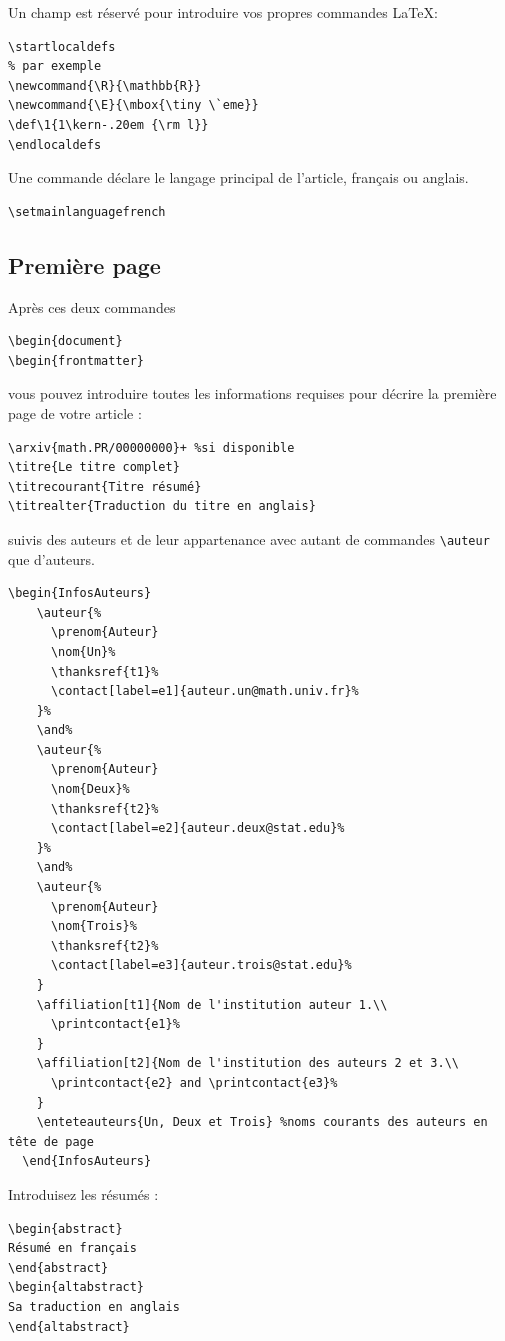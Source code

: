 \documentclass[soumission]{jsfds}
\newcommand{\R}{\mathbb{R}}
\newcommand{\E}{\mbox{\tiny \`eme}}
\def\1{1\kern-.20em {\rm l}}
\begin{document}
Un champ est réservé pour introduire vos propres commandes \LaTeX :
\begin{verbatim}
\startlocaldefs
% par exemple
\newcommand{\R}{\mathbb{R}}
\newcommand{\E}{\mbox{\tiny \`eme}}
\def\1{1\kern-.20em {\rm l}}
\endlocaldefs
\end{verbatim}
Une commande déclare le langage principal de l'article, français ou anglais.
\begin{verbatim}
\setmainlanguagefrench
\end{verbatim}

\subsection{Première page}
Après ces deux commandes
\begin{verbatim}
\begin{document}
\begin{frontmatter}
\end{verbatim}
vous pouvez introduire toutes les informations requises pour décrire la première page de votre article :
\begin{verbatim}
\arxiv{math.PR/00000000}+ %si disponible 
\titre{Le titre complet}
\titrecourant{Titre résumé}
\titrealter{Traduction du titre en anglais}
\end{verbatim}
suivis des auteurs et de leur appartenance avec autant de commandes \verb+\auteur+ que d'auteurs.
\begin{verbatim}
\begin{InfosAuteurs}
    \auteur{%
      \prenom{Auteur} 
      \nom{Un}%
      \thanksref{t1}%
      \contact[label=e1]{auteur.un@math.univ.fr}%
    }%
    \and%
    \auteur{%
      \prenom{Auteur} 
      \nom{Deux}%
      \thanksref{t2}%
      \contact[label=e2]{auteur.deux@stat.edu}%
    }%
    \and%
    \auteur{%
      \prenom{Auteur} 
      \nom{Trois}%
      \thanksref{t2}%
      \contact[label=e3]{auteur.trois@stat.edu}%
    }
    \affiliation[t1]{Nom de l'institution auteur 1.\\ 
      \printcontact{e1}%
    }
    \affiliation[t2]{Nom de l'institution des auteurs 2 et 3.\\ 
      \printcontact{e2} and \printcontact{e3}% 
    }
    \enteteauteurs{Un, Deux et Trois} %noms courants des auteurs en tête de page
  \end{InfosAuteurs}
\end{verbatim}
Introduisez les résumés : 
\begin{verbatim}
\begin{abstract}
Résumé en français
\end{abstract}
\begin{altabstract}
Sa traduction en anglais
\end{altabstract}
\end{verbatim}
\end{document}
